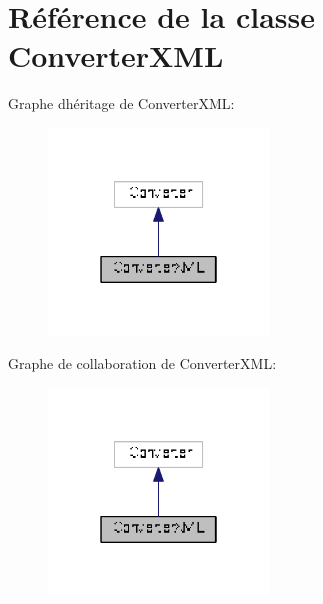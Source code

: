 \hypertarget{class_converter_x_m_l}{}\section{Référence de la classe Converter\+X\+ML}
\label{class_converter_x_m_l}


Graphe d\textquotesingle{}héritage de Converter\+X\+ML\+:
\nopagebreak
\begin{figure}[H]
\begin{center}
\leavevmode
\includegraphics[width=166pt]{class_converter_x_m_l__inherit__graph}
\end{center}
\end{figure}


Graphe de collaboration de Converter\+X\+ML\+:
\nopagebreak
\begin{figure}[H]
\begin{center}
\leavevmode
\includegraphics[width=166pt]{class_converter_x_m_l__coll__graph}
\end{center}
\end{figure}
